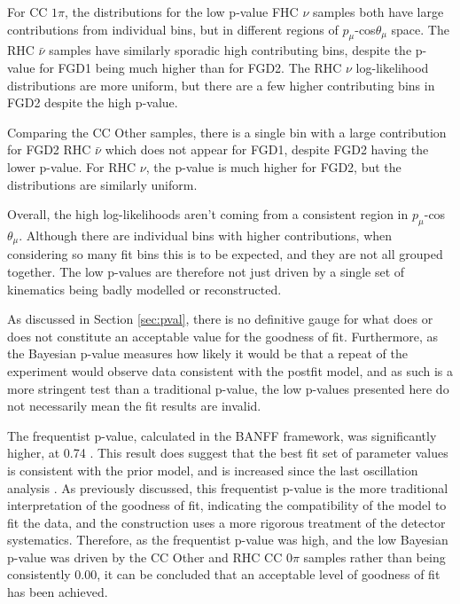 For CC $1\pi$, the distributions for the low p-value FHC $\nu$ samples both have large contributions from individual bins, but in different regions of $p_{\mu}$-cos$\theta_{\mu}$ space. The RHC $\bar{\nu}$ samples have similarly sporadic high contributing bins, despite the p-value for FGD1 being much higher than for FGD2. The RHC $\nu$ log-likelihood distributions are more uniform, but there are a few higher contributing bins in FGD2 despite the high p-value.

Comparing the CC Other samples, there is a single bin with a large contribution for FGD2 RHC $\bar{\nu}$ which does not appear for FGD1, despite FGD2 having the lower p-value. For RHC $\nu$, the p-value is much higher for FGD2, but the distributions are similarly uniform.

Overall, the high log-likelihoods aren't coming from a consistent region in $p_{\mu}$-cos$\theta_{\mu}$. Although there are individual bins with higher contributions, when considering so many fit bins this is to be expected, and they are not all grouped together.  The low p-values are therefore not just driven by a single set of kinematics being badly modelled or reconstructed. 

As discussed in Section \ref{sec:pval}, there is no definitive gauge for what does or does not constitute an acceptable value for the goodness of fit. Furthermore, as the Bayesian p-value measures how likely it would be that a repeat of the experiment would observe data consistent with the postfit model, and as such is a more stringent test than a traditional p-value, the low p-values presented here do not necessarily mean the fit results are invalid.

The frequentist p-value, calculated in the BANFF framework, was significantly higher, at 0.74 \cite{tn395}. This result does suggest that the best fit set of parameter values is consistent with the prior model, and is increased since the last oscillation analysis \cite{tn324}. As previously discussed, this frequentist p-value is the more traditional interpretation of the goodness of fit, indicating the compatibility of the model to fit the data, and the construction uses a more rigorous treatment of the detector systematics. Therefore, as the frequentist p-value was high, and the low Bayesian p-value was driven by the CC Other and RHC CC $0\pi$ samples rather than being consistently 0.00, it can be concluded that an acceptable level of goodness of fit has been achieved.

